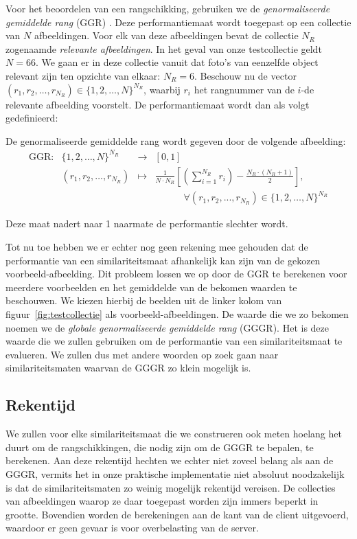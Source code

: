 Voor het beoordelen van een rangschikking, gebruiken we de \emph{genormaliseerde gemiddelde rang} 
(GGR) \cite{muller:perf_eval}. Deze performantiemaat wordt toegepast op een collectie
van $N$ afbeeldingen. Voor elk van deze afbeeldingen bevat de collectie
$N_R$ zogenaamde \emph{relevante afbeeldingen}. In het geval van onze testcollectie geldt $N = 66$.
We gaan er in deze collectie vanuit dat foto's van eenzelfde object relevant zijn ten opzichte
van elkaar: $N_R = 6$. Beschouw nu de vector 
$(r_1,r_2,\ldots,r_{N_R}) \in \{1,2,\ldots,N\}^{N_R}$, waarbij $r_i$ het
rangnummer van de $i$-de relevante afbeelding voorstelt. De performantiemaat
wordt dan als volgt gedefinieerd:
\begin{definitie}
De genormaliseerde gemiddelde rang wordt gegeven door de volgende afbeelding:
$$
\begin{array}{lrcl}
\textrm{GGR}: 	& \{1,2,\ldots,N\}^{N_R} & \to 	& [0,1] \\
		& (r_1,r_2,\ldots,r_{N_R}) & \mapsto &
	{\displaystyle\frac{1}{N \cdot N_R}\left[ \left(\sum_{i=1}^{N_R}r_i\right) - \frac{N_R \cdot (N_R + 1)}{2} \right]},\\[15pt]
	& & & \qquad \quad \forall (r_1, r_2, ..., r_{N_R}) \in \{1,2,\ldots,N\}^{N_R}
\end{array}
$$
\end{definitie}
\noindent
Deze maat nadert naar 1 naarmate de performantie slechter wordt.

Tot nu toe hebben we er echter nog geen rekening mee gehouden dat de performantie van
een similariteitsmaat afhankelijk kan zijn van de gekozen voorbeeld-afbeelding. Dit probleem lossen we
op door de GGR te berekenen voor meerdere voorbeelden en het gemiddelde van de bekomen waarden
te beschouwen. We kiezen hierbij de beelden uit de linker kolom van 
figuur~\ref{fig:testcollectie} als voorbeeld-afbeeldingen. De waarde die we zo bekomen noemen we de
\emph{globale genormaliseerde gemiddelde rang} (GGGR). Het is deze waarde die we zullen gebruiken
om de performantie van een similariteitsmaat te evalueren. We zullen dus met andere woorden op
zoek gaan naar similariteitsmaten waarvan de GGGR zo klein mogelijk is.

\subsection{Rekentijd}

We zullen voor elke similariteitsmaat die we construeren ook meten hoelang het duurt om
de rangschikkingen, die nodig zijn om de GGGR te bepalen, te berekenen. Aan deze 
rekentijd hechten we echter niet zoveel belang als aan de GGGR, vermits het in onze
praktische implementatie niet absoluut noodzakelijk is dat de similariteitsmaten zo weinig
mogelijk rekentijd vereisen. De collecties van afbeeldingen waarop ze daar toegepast worden
zijn immers beperkt in grootte. Bovendien worden de berekeningen aan de kant van de client
uitgevoerd, waardoor er geen gevaar is voor overbelasting van de server.


